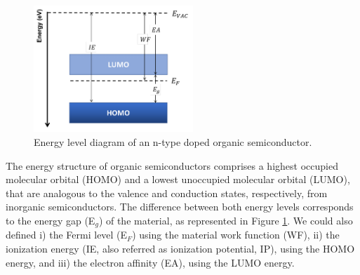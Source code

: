 \begin{figure}[h]
  \centering
  \includegraphics[width=6cm]{Images/pdf/ediagram.pdf}
  \caption[Energy level diagram of organic semiconductors]{Energy level diagram of an n-type doped organic semiconductor.}
  \label{fig:ediag}
\end{figure}

The energy structure of organic semiconductors comprises a highest occupied molecular orbital (HOMO) and a lowest unoccupied molecular orbital (LUMO), that are analogous to the valence and conduction %
states, respectively, from inorganic semiconductors. The difference between both energy levels corresponds to the energy gap (E$_{g}$) of the material, as represented in Figure \ref{fig:ediag}. We could also defined i) the Fermi level (E$_{F}$) using the material work function (WF), ii) the ionization energy (IE, also referred as ionization potential, IP), using the HOMO energy, and iii) the electron affinity (EA), using the LUMO energy.



